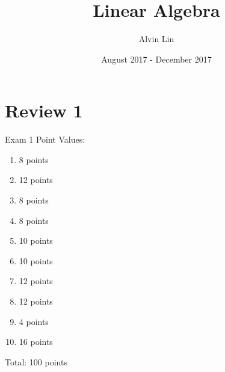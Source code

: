 \documentclass[letterpaper, 12pt]{math}
\title{Linear Algebra}
\author{Alvin Lin}
\date{August 2017 - December 2017}
\begin{document}
\maketitle

\section*{Review 1}
Exam 1 Point Values:
\begin{enumerate}
  \item 8 points
  \item 12 points
  \item 8 points
  \item 8 points
  \item 10 points
  \item 10 points
  \item 12 points
  \item 12 points
  \item 4 points
  \item 16 points
\end{enumerate}
Total: 100 points \\ \\
\end{document}
